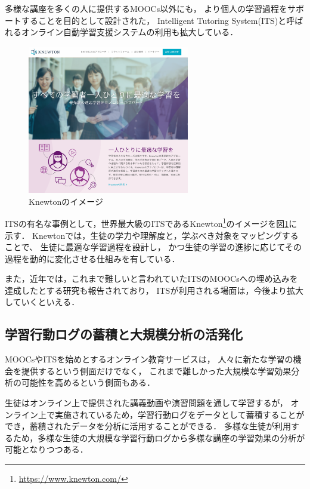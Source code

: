 多様な講座を多くの人に提供するMOOCs以外にも，
より個人の学習過程をサポートすることを目的として設計された，
Intelligent Tutoring System(ITS)と呼ばれるオンライン自動学習支援システムの利用も拡大している\cite{sleeman1982intelligent}．

\begin{figure}[htb]
\begin{center}
\includegraphics[width=200pt]{./img/knewton.png}
\end{center}
\caption{Knewtonのイメージ}
\label{fig:knewton}
\end{figure}

ITSの有名な事例として，世界最大級のITSであるKnewton\footnote{\url{https://www.knewton.com/}}のイメージを図\ref{fig:knewton}に示す．
Knewtonでは，生徒の学力や理解度と，学ぶべき対象をマッピングすることで、
生徒に最適な学習過程を設計し，
かつ生徒の学習の進捗に応じてその過程を動的に変化させる仕組みを有している\cite{upbin2012knewton}．


また，近年では，これまで難しいと言われていたITSのMOOCsへの埋め込みを達成したとする研究\cite{aleven2015beginning}も報告されており，
ITSが利用される場面は，今後より拡大していくといえる．



\subsection{学習行動ログの蓄積と大規模分析の活発化}

MOOCsやITSを始めとするオンライン教育サービスは，
人々に新たな学習の機会を提供するという側面だけでなく，
これまで難しかった大規模な学習効果分析の可能性を高めるという側面もある．

生徒はオンライン上で提供された講義動画や演習問題を通して学習するが，
オンライン上で実施されているため，学習行動ログをデータとして蓄積することができ，蓄積されたデータを分析に活用することができる．
多様な生徒が利用するため，多様な生徒の大規模な学習行動ログから多様な講座の学習効果の分析が可能となりつつある．

